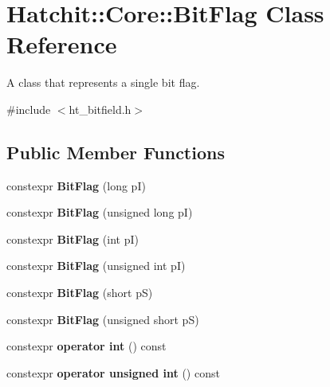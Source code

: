 \hypertarget{classHatchit_1_1Core_1_1BitFlag}{}\section{Hatchit\+:\+:Core\+:\+:Bit\+Flag Class Reference}
\label{classHatchit_1_1Core_1_1BitFlag}


A class that represents a single bit flag.  




{\ttfamily \#include $<$ht\+\_\+bitfield.\+h$>$}

\subsection*{Public Member Functions}
\begin{DoxyCompactItemize}
\item 
constexpr {\bfseries Bit\+Flag} (long pI)\hypertarget{classHatchit_1_1Core_1_1BitFlag_a87b6aa20a4a882ade564d54af2a8f689}{}\label{classHatchit_1_1Core_1_1BitFlag_a87b6aa20a4a882ade564d54af2a8f689}

\item 
constexpr {\bfseries Bit\+Flag} (unsigned long pI)\hypertarget{classHatchit_1_1Core_1_1BitFlag_a90316592577918f987aaead15ee87233}{}\label{classHatchit_1_1Core_1_1BitFlag_a90316592577918f987aaead15ee87233}

\item 
constexpr {\bfseries Bit\+Flag} (int pI)\hypertarget{classHatchit_1_1Core_1_1BitFlag_a2f9434a1154333e86b1828903836f540}{}\label{classHatchit_1_1Core_1_1BitFlag_a2f9434a1154333e86b1828903836f540}

\item 
constexpr {\bfseries Bit\+Flag} (unsigned int pI)\hypertarget{classHatchit_1_1Core_1_1BitFlag_a0122c248e67a387b2a76670e489b3931}{}\label{classHatchit_1_1Core_1_1BitFlag_a0122c248e67a387b2a76670e489b3931}

\item 
constexpr {\bfseries Bit\+Flag} (short pS)\hypertarget{classHatchit_1_1Core_1_1BitFlag_aedf20d2df56221c358121126cb9604cd}{}\label{classHatchit_1_1Core_1_1BitFlag_aedf20d2df56221c358121126cb9604cd}

\item 
constexpr {\bfseries Bit\+Flag} (unsigned short pS)\hypertarget{classHatchit_1_1Core_1_1BitFlag_a1d5568095665401925587217d8a09d0d}{}\label{classHatchit_1_1Core_1_1BitFlag_a1d5568095665401925587217d8a09d0d}

\item 
constexpr {\bfseries operator int} () const \hypertarget{classHatchit_1_1Core_1_1BitFlag_a6a3c08674e68ae27ba3ea77047cc969b}{}\label{classHatchit_1_1Core_1_1BitFlag_a6a3c08674e68ae27ba3ea77047cc969b}

\item 
constexpr {\bfseries operator unsigned int} () const \hypertarget{classHatchit_1_1Core_1_1BitFlag_ad2ab3b75a23fa239388687548dc2b092}{}\label{classHatchit_1_1Core_1_1BitFlag_ad2ab3b75a23fa239388687548dc2b092}

\end{DoxyCompactItemize}


